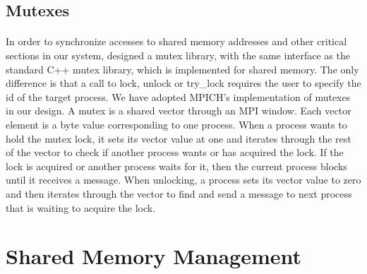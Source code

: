 \subsection{Mutexes}
\paragraph{}
In order to synchronize accesses to shared memory addresses and other critical sections in our system, designed
a mutex library, with the same interface as the standard C++ mutex library, which is implemented
for shared memory.  The only difference is that a call to lock, unlock or try\_lock requires the user to specify
the id of the target process. We have adopted MPICH's implementation of mutexes in our design.  A mutex is a
shared vector through an MPI window.  Each vector element is a byte value corresponding to one process.  When
a process wants to hold the mutex lock, it sets its vector value at one and iterates through the rest of the 
vector to check if another process wants or has acquired the lock.  If the lock is acquired or another process 
waits for it, then the current process blocks until it receives a message.  When unlocking, a process sets its 
vector value to zero and then iterates through the vector to find and send a message to next process that is 
waiting to acquire the lock.  

\section{Shared Memory Management}
\label{sect:shared-memory-manager}

